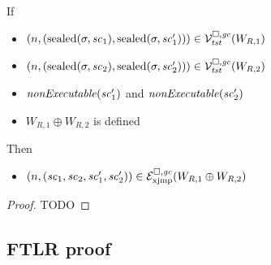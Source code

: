 \begin{lemma}
  \label{lem:sealed-lrv-lrexj}
  If
  \begin{itemize}
  \item $\left(n,(\mathrm{sealed}(\sigma,\mathit{sc}_1),\mathrm{sealed}(\sigma,\mathit{sc}_1'))\right) \in \mathcal{V}^{\square,\mathit{gc}}_{\mathit{tst}}(W_{R,1})$
  \item $\left(n,(\mathrm{sealed}(\sigma,\mathit{sc}_2),\mathrm{sealed}(\sigma,\mathit{sc}_2'))\right) \in \mathcal{V}^{\square,\mathit{gc}}_{\mathit{tst}}(W_{R,2})$ 
  \item $\nonExec{\vsc_1'}$ and $\nonExec{\vsc_2'}$
  \item $W_{R,1} \oplus W_{R,2}$ is defined
  \end{itemize}
  Then
  \begin{itemize}
  \item $\left(n,(\mathit{sc}_1,\mathit{sc}_2,\mathit{sc}_1',\mathit{sc}_2')\right) \in \mathcal{E}^{\square,\mathit{gc}}_{\mathrm{xjmp}}(W_{R,1}\oplus W_{R,2})$
  \end{itemize}
\end{lemma}
\begin{proof}
  TODO
\end{proof}

\subsection{FTLR proof}

